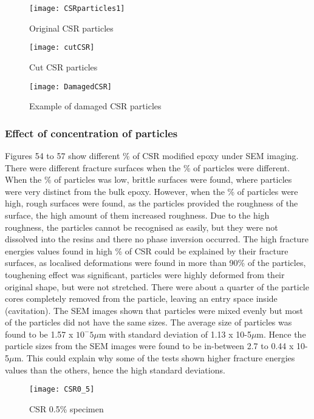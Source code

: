 \documentclass[numbers=noendperiod,chapterprefix=on]{icldt} %
\begin{document}
\begin{figure}[!htpb]
\centering
\texttt{[image: CSRparticles1]}
\caption{Original CSR particles}
\end{figure}

\begin{figure}[!htpb]
\centering
\texttt{[image: cutCSR]}
\caption{Cut CSR particles }
\end{figure}

\begin{figure}[!htpb]
\centering
\texttt{[image: DamagedCSR]}
\caption{Example of damaged CSR particles }
\end{figure}

\subsubsection{Effect of concentration of particles}
Figures 54 to 57 show different \% of CSR modified epoxy under SEM imaging. There were different fracture surfaces when the \% of particles were different. When the \% of particles was low, brittle surfaces were found, where particles were very distinct from the bulk epoxy. However, when the \% of particles were high, rough surfaces were found, as the particles provided the roughness of the surface, the high amount of them increased roughness. Due to the high roughness, the particles cannot be recognised as easily, but they were not dissolved into the resins and there no phase inversion occurred. The high fracture energies values found in high \% of CSR could be explained by their fracture surfaces, as localised deformations were found in more than 90\% of the particles, toughening effect was significant, particles were highly deformed from their original shape, but were not stretched. There were about a quarter of the particle cores completely removed from the particle, leaving an entry space inside (cavitation). The SEM images shown that particles were mixed evenly but most of the particles did not have the same sizes. The average size of particles was found to be 1.57 x $10^-5\mu$m with standard deviation of 1.13 x 10-5$\mu$m. Hence the particle sizes from the SEM images were found to be in-between 2.7 to 0.44 x 10-5$\mu$m. This could explain why some of the tests shown higher fracture energies values than the others, hence the high standard deviations. 

\begin{figure}[!hp]
\centering
\texttt{[image: CSR0\_5]}
\caption{CSR 0.5\% specimen}
\end{figure}
\end{document}
